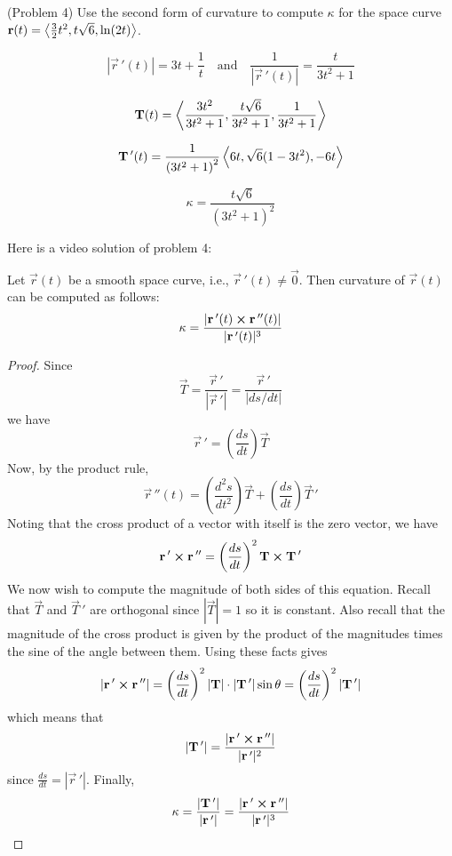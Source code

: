 \documentclass[handout]{ximera}
\begin{document}
\begin{problem}(Problem 4)
Use the second form of curvature to compute $\kappa$ for the space curve $\mathbf r(t) = \left\langle \frac32 t^2, t\sqrt 6 , \ln(2t)\right\rangle$.


\begin{hint}
\[
\left|\vec r\,'(t) \right| = 3t + \frac{1}{t}  \quad \text{and} \quad \frac{1}{\left|\vec r\,'(t) \right|} = \frac{t}{3t^2 + 1}
\]
\end{hint}

\begin{hint}
\[
\mathbf T(t) = \left\langle \frac{3t^2}{3t^2 +1},\frac{t\sqrt 6}{3t^2 +1} , \frac{1}{3t^2 +1}\right\rangle
\]
\end{hint}

\begin{hint}
\[
\mathbf T\,'(t) = \frac{1}{\left(3t^2 +1\right)^2} \left\langle 6t, \sqrt 6 (1 - 3t^2), -6t\right\rangle
\]
\end{hint}

\begin{hint}
\[
\kappa = \frac{t\sqrt 6}{\left(3t^2 +1\right)^2}
\]
\end{hint}

\end{problem}

Here is a video solution of problem 4:\\
\begin{foldable}
\end{foldable}

\begin{proposition}
Let $\vec r(t)$ be a smooth space curve, i.e., $\vec r\,'(t) \neq \vec 0$. Then curvature of $\vec r(t)$ can be computed as follows:
\[
\kappa = \frac{|\mathbf r\,'(t) \boldsymbol\times \mathbf r\,''(t)|}{|\mathbf r\,'(t)|^3}
\]
\end{proposition}


\begin{proof}
Since
\[
\vec T = \frac{\vec r\,'}{|\vec r\, '|} = \frac{\vec r\,'}{|ds/dt|}
\]
we have
\[
\vec r\,' = \left(\frac{ds}{dt}\right) \vec T
\]
Now, by the product rule,
\[
 \vec r\,''(t) = \left(\frac{d^2s}{dt^2}\right) \vec T + \left(\frac{ds}{dt}\right) \vec T\,'
\]
Noting that the cross product of a vector with itself is the zero vector, we have
\[
\mathbf r\,' \boldsymbol\times \mathbf r\,'' = \left(\frac{ds}{dt}\right)^2 \mathbf T \boldsymbol\times \mathbf T\,'
\]
We now wish to compute the magnitude of both sides of this equation.
Recall that $\vec T$ and $\vec T\,'$ are orthogonal since $|\vec T| = 1$ so it is constant. Also recall that the 
magnitude of the cross product is given by the product of the magnitudes times the sine of the angle between them. 
Using these facts gives
\[
|\mathbf r\,' \boldsymbol\times \mathbf r\,''| = \left(\frac{ds}{dt}\right)^2 | \mathbf T|\cdot | \mathbf T\,'|\sin \theta =\left(\frac{ds}{dt}\right)^2 | \mathbf T\,'|
\]
which means that
\[
| \mathbf T\,'| = \frac{|\mathbf r\,' \boldsymbol\times \mathbf r\,''|}{|\mathbf r\,'|^2}
\]
since $\frac{ds}{dt} = |\vec r\,'|$.
Finally,
\[
\kappa = \frac{| \mathbf T\,'|}{|\mathbf r\,'|} = \frac{|\mathbf r\,' \boldsymbol\times \mathbf r\,''|}{|\mathbf r\,'|^3}
\]
\end{proof}
\end{document}
